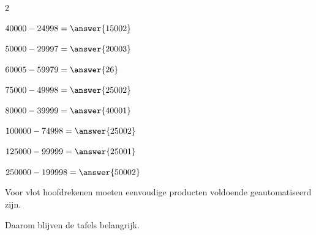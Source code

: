 \documentclass{ximera}
\begin{document}
\begin{oefening}{\oefG}
\begin{multicols}{2}
\begin{question} \(40000-24998=\answer{15002}\) \end{question}

\begin{question} \(50000-29997=\answer{20003}\) \end{question}

\begin{question} \(60005-59979=\answer{26}\) \end{question}

\begin{question} \(75000-49998=\answer{25002}\) \end{question}

\begin{question} \(80000-39999=\answer{40001}\) \end{question}

\begin{question} \(100000-74998=\answer{25002}\) \end{question}

\begin{question} \(125000-99999=\answer{25001}\) \end{question}

\begin{question} \(250000-199998=\answer{50002}\) \end{question}

\end{multicols}

\end{oefening}


Voor vlot hoofdrekenen moeten eenvoudige producten voldoende geautomatiseerd
zijn.

Daarom blijven de tafels belangrijk.



\end{document}
